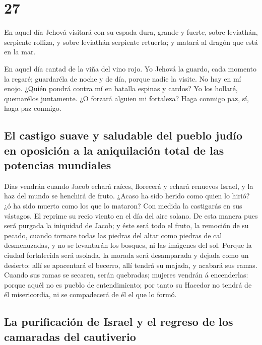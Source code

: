 \hypertarget{section-26}{%
\section{27}\label{section-26}}

 En aquel día Jehová visitará con su espada dura, grande y
fuerte, sobre leviathán, serpiente rolliza, y sobre leviathán serpiente
retuerta; y matará al dragón que está en la mar.

 En aquel día cantad de la viña del vino rojo.
 Yo Jehová la guardo, cada momento la regaré; guardaréla
de noche y de día, porque nadie la visite.  No hay en mí
enojo. ¿Quién pondrá contra mí en batalla espinas y cardos? Yo los
hollaré, quemarélos juntamente.  ¿O forzará alguien mi
fortaleza? Haga conmigo paz, sí, haga paz conmigo.

\hypertarget{el-castigo-suave-y-saludable-del-pueblo-juduxedo-en-oposiciuxf3n-a-la-aniquilaciuxf3n-total-de-las-potencias-mundiales}{%
\subsection{El castigo suave y saludable del pueblo judío en oposición a
la aniquilación total de las potencias
mundiales}\label{el-castigo-suave-y-saludable-del-pueblo-juduxedo-en-oposiciuxf3n-a-la-aniquilaciuxf3n-total-de-las-potencias-mundiales}}

 Días vendrán cuando Jacob echará raíces, florecerá y
echará renuevos Israel, y la haz del mundo se henchirá de fruto.
 ¿Acaso ha sido herido como quien lo hirió? ¿ó ha sido
muerto como los que lo mataron?  Con medida la castigarás
en sus vástagos. El reprime su recio viento en el día del aire solano.
 De esta manera pues será purgada la iniquidad de Jacob; y
éste será todo el fruto, la remoción de su pecado, cuando tornare todas
las piedras del altar como piedras de cal desmenuzadas, y no se
levantarán los bosques, ni las imágenes del sol.  Porque
la ciudad fortalecida será asolada, la morada será desamparada y dejada
como un desierto: allí se apacentará el becerro, allí tendrá su majada,
y acabará sus ramas.  Cuando sus ramas se secaren, serán
quebradas; mujeres vendrán á encenderlas: porque aquél no es pueblo de
entendimiento; por tanto su Hacedor no tendrá de él misericordia, ni se
compadecerá de él el que lo formó.

\hypertarget{la-purificaciuxf3n-de-israel-y-el-regreso-de-los-camaradas-del-cautiverio}{%
\subsection{La purificación de Israel y el regreso de los camaradas del
cautiverio}\label{la-purificaciuxf3n-de-israel-y-el-regreso-de-los-camaradas-del-cautiverio}}

